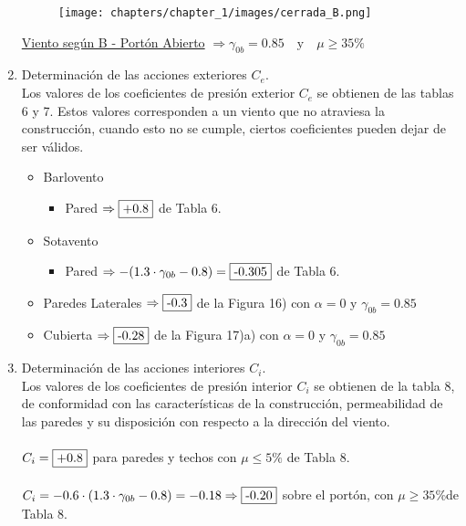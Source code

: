 \begin{enumerate}
\newpage
\begin{figure}[H]
\begin{center}
     \texttt{[image: chapters/chapter\_1/images/cerrada\_B.png]}
\end{center}
\end{figure}

\newpage

\underline{Viento según B - Portón Abierto} $\Rightarrow \gamma_{0b}=0.85 \quad \text{y} \quad \mu \geq 35\%$\\

\item Determinación de las acciones exteriores $C_e$.\\
Los valores de los coeficientes de presión exterior $C_e$ se obtienen de las tablas 6 y 7. Estos valores corresponden a un viento que no atraviesa la construcción, cuando esto no se cumple, ciertos coeficientes pueden dejar de ser válidos.\\
\begin{itemize}
	\item Barlovento	
		\begin{itemize}
		\item Pared $\Rightarrow \framebox{+0.8} $ de Tabla 6.
		\end{itemize}
	\item Sotavento
		\begin{itemize}
		\item Pared $\Rightarrow -(1.3 \cdot \gamma_{0b}-0.8) = \framebox{-0.305}$ de Tabla 6.
		\end{itemize}
	\item Paredes Laterales $\Rightarrow \framebox{-0.3} $ de la Figura 16) con $\alpha = 0 $ y $\gamma_{0b}=0.85$
    \item Cubierta $\Rightarrow \framebox{-0.28} $ de la Figura 17)a) con $\alpha = 0 $ y $\gamma_{0b}=0.85$
\end{itemize}

\item Determinación de las acciones interiores $C_i$.\\
Los valores de los coeficientes de presión interior $C_i$ se obtienen de la tabla 8, de conformidad con las características de la construcción, permeabilidad de las paredes y su disposición con respecto a la dirección del viento.\\
\\
$ C_i = \framebox{+0.8} $ para paredes y techos con $\mu \leq 5\%$ de Tabla 8.\\
\\
$ C_i = - 0.6 \cdot (1.3 \cdot \gamma_{0b} - 0.8) = -0.18 \Rightarrow \framebox{-0.20} $ sobre el portón, con $\mu \geq 35\%$de Tabla 8.\\


\end{enumerate}
